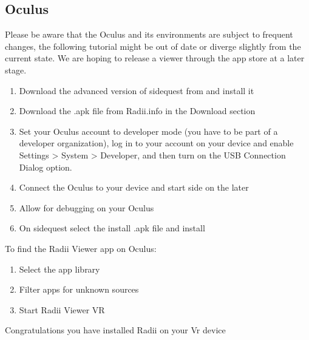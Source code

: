 \documentclass[letterpaper,10pt,english]{sphinxmanual}
\begin{document}
\subsection{Oculus}
\label{\detokenize{tutorial/Setup/install_setup:oculus}}
\sphinxAtStartPar
Please be aware that the Oculus and its environments are subject to frequent changes, the following tutorial might be out of date or diverge slightly from the current state. We are hoping to release a viewer through the app store at a later stage.
\begin{enumerate}
%
\item {} 
\sphinxAtStartPar
Download the advanced version of sidequest from  and install it

\item {} 
\sphinxAtStartPar
Download the .apk file from Radii.info in the Download section

\item {} 
\sphinxAtStartPar
Set your Oculus account to developer mode (you have to be part of a developer organization), log in to your account on your device and enable Settings \textgreater{} System \textgreater{} Developer, and then turn on the USB Connection Dialog option.

\item {} 
\sphinxAtStartPar
Connect the Oculus to your device and start side on the later

\item {} 
\sphinxAtStartPar
Allow for debugging on your Oculus

\item {} 
\sphinxAtStartPar
On sidequest select the install .apk file and install

\end{enumerate}

\sphinxAtStartPar
To find the Radii Viewer app on Oculus:
\begin{enumerate}
%
\item {} 
\sphinxAtStartPar
Select the app library

\item {} 
\sphinxAtStartPar
Filter apps for unknown sources

\item {} 
\sphinxAtStartPar
Start Radii Viewer VR

\end{enumerate}

\sphinxAtStartPar
Congratulations you have installed Radii on your Vr device
\end{document}
